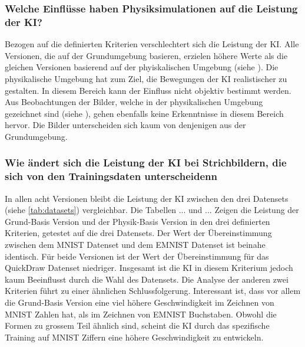 \subsubsection*{Welche Einflüsse haben Physiksimulationen auf die Leistung der KI?}
\label{subsub:d_frage_unter_4}
Bezogen auf die definierten Kriterien verschlechtert sich die Leistung der KI.
Alle Versionen, die auf der Grundumgebung basieren, erzielen höhere Werte als
die gleichen Versionen basierend auf der phyiskalischen Umgebung (siehe
). Die physikalische Umgebung hat zum Ziel, die
Bewegungen der KI realistischer zu gestalten. In diesem Bereich kann der
Einfluss nicht objektiv bestimmt werden. Aus Beobachtungen der Bilder, welche in
der physikalischen Umgebung gezeichnet sind (siehe ), gehen
ebenfalls keine Erkenntnisse in diesem Bereich hervor. Die Bilder unterscheiden
sich kaum von denjenigen aus der Grundumgebung.

\subsubsection*{Wie ändert sich die Leistung der KI bei Strichbildern, die sich von den Trainingsdaten unterscheidenn}
\label{subsub:d_frage_unter_5}
In allen acht Versionen bleibt die Leistung der KI zwischen den drei Datensets
(siehe \autoref{tab:datasets}) vergleichbar. Die Tabellen {...} und {...} Zeigen
die Leistung der Grund-Basis Version und der Physik-Basis Version in den drei
definierten Kriterien, getestet auf die drei Datensets. Der Wert der
Übereinstimmung zwischen dem MNIST Datenset und dem EMNIST Datenset ist beinahe
identisch. Für beide Versionen ist der Wert der Übereinstimmung für das
QuickDraw Datenset niedriger. Insgesamt ist die KI in diesem Kriterium jedoch
kaum Beeinflusst durch die Wahl des Datensets. Die Analyse der anderen zwei
Kriterien führt zu einer ähnlichen Schlussfolgerung. Interessant ist, dass vor
allem die Grund-Basis Version eine viel höhere Geschwindigkeit im Zeichnen von
MNIST Zahlen hat, als im Zeichnen von EMNIST Buchstaben. Obwohl die Formen zu
grossem Teil ähnlich sind, scheint die KI durch das spezifische Training auf
MNIST Ziffern eine höhere Geschwindigkeit zu entwickeln. 


